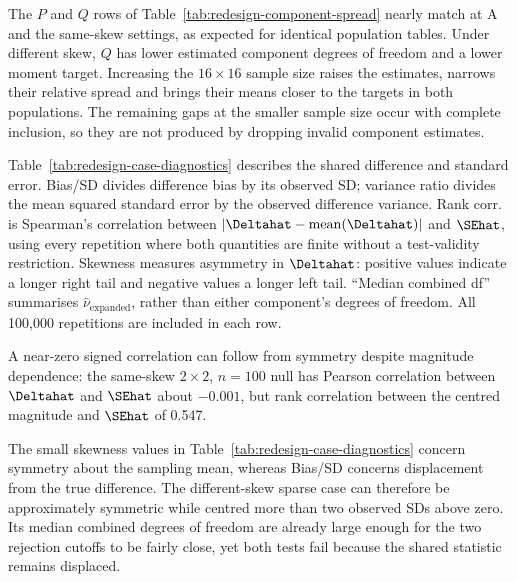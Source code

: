 The \(P\) and \(Q\) rows of Table~\ref{tab:redesign-component-spread}
nearly match at A and the same-skew settings, as expected
for identical population tables. Under different skew, \(Q\) has lower
estimated component degrees of freedom and a lower moment target.
Increasing the \(16\times16\) sample size raises the estimates, narrows
their relative spread and brings their means closer to the targets in
both populations. The remaining gaps at the smaller sample size occur
with complete inclusion, so they are not produced by dropping invalid
component estimates.

Table~\ref{tab:redesign-case-diagnostics} describes the shared difference
and standard error. Bias/SD divides difference bias by its observed SD;
variance ratio divides the mean squared standard error by the observed
difference variance. Rank corr. is Spearman's correlation between
\(|\Deltahat-\operatorname{mean}(\Deltahat)|\) and \(\SEhat\), using every repetition
where both quantities are finite without a test-validity restriction.
Skewness measures asymmetry in \(\Deltahat\): positive values indicate a
longer right tail and negative values a longer left tail. ``Median combined
df'' summarises \(\widehat\nu_{\mathrm{expanded}}\), rather than either
component's degrees of freedom. All 100,000 repetitions are included
in each row.

A near-zero signed correlation can follow from symmetry despite
magnitude dependence: the same-skew \(2\times2\), \(n=100\) null has
Pearson correlation between \(\Deltahat\) and \(\SEhat\) about
\(-0.001\), but rank correlation between the centred magnitude and
\(\SEhat\) of 0.547.

\begin{table}[H]
\centering
\small
\setlength{\tabcolsep}{3pt}
\caption{Shared-estimator diagnostics and combined degrees of freedom.}
\label{tab:redesign-case-diagnostics}

\end{table}

The small skewness values in Table~\ref{tab:redesign-case-diagnostics}
concern symmetry about the sampling
mean, whereas Bias/SD concerns displacement from the true difference.
The different-skew sparse case can therefore be approximately symmetric
while centred more than two observed SDs above zero. Its median combined
degrees of freedom are already large enough for the two rejection
cutoffs to be fairly close, yet both tests fail because the shared
statistic remains displaced.

